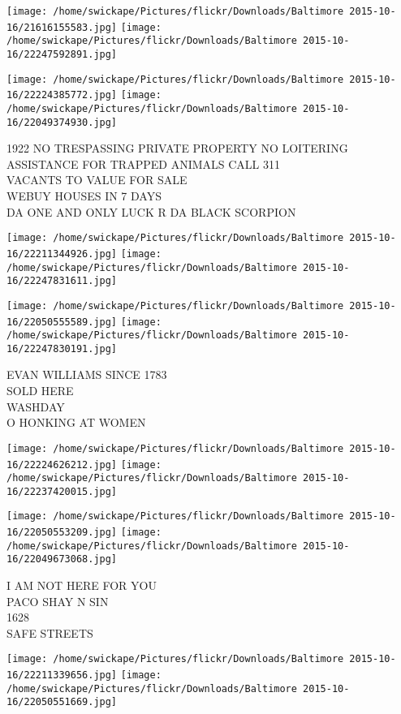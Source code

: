 \documentclass[10pt,letterpaper]{article}
\begin{document}
\texttt{[image: /home/swickape/Pictures/flickr/Downloads/Baltimore 2015-10-16/21616155583.jpg]}
\texttt{[image: /home/swickape/Pictures/flickr/Downloads/Baltimore 2015-10-16/22247592891.jpg]}

\texttt{[image: /home/swickape/Pictures/flickr/Downloads/Baltimore 2015-10-16/22224385772.jpg]}
\texttt{[image: /home/swickape/Pictures/flickr/Downloads/Baltimore 2015-10-16/22049374930.jpg]}

1922 NO TRESPASSING PRIVATE PROPERTY NO LOITERING ASSISTANCE FOR TRAPPED ANIMALS CALL 311\\
VACANTS TO VALUE FOR SALE\\
WEBUY HOUSES IN 7 DAYS\\
DA ONE AND ONLY LUCK R DA BLACK SCORPION
\pagebreak

\texttt{[image: /home/swickape/Pictures/flickr/Downloads/Baltimore 2015-10-16/22211344926.jpg]}
\texttt{[image: /home/swickape/Pictures/flickr/Downloads/Baltimore 2015-10-16/22247831611.jpg]}

\texttt{[image: /home/swickape/Pictures/flickr/Downloads/Baltimore 2015-10-16/22050555589.jpg]}
\texttt{[image: /home/swickape/Pictures/flickr/Downloads/Baltimore 2015-10-16/22247830191.jpg]}

EVAN WILLIAMS SINCE 1783\\
SOLD HERE\\
WASHDAY\\
O HONKING AT WOMEN
\pagebreak

\texttt{[image: /home/swickape/Pictures/flickr/Downloads/Baltimore 2015-10-16/22224626212.jpg]}
\texttt{[image: /home/swickape/Pictures/flickr/Downloads/Baltimore 2015-10-16/22237420015.jpg]}

\texttt{[image: /home/swickape/Pictures/flickr/Downloads/Baltimore 2015-10-16/22050553209.jpg]}
\texttt{[image: /home/swickape/Pictures/flickr/Downloads/Baltimore 2015-10-16/22049673068.jpg]}

I AM NOT HERE FOR YOU\\
PACO SHAY N SIN\\
1628\\
SAFE STREETS
\pagebreak

\texttt{[image: /home/swickape/Pictures/flickr/Downloads/Baltimore 2015-10-16/22211339656.jpg]}
\texttt{[image: /home/swickape/Pictures/flickr/Downloads/Baltimore 2015-10-16/22050551669.jpg]}
\end{document}
